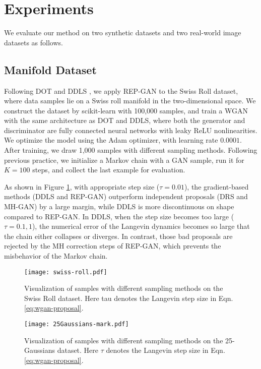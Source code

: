 \documentclass[runningheads]{llncs}
\newcommand{\<}{\left\langle}
\renewcommand{\>}{\right\rangle}
\begin{document}
\section{Experiments}
\label{sec:experiments}
We evaluate our method  on two synthetic datasets and two real-world image datasets as follows.

\subsection{Manifold Dataset}
Following DOT \cite{tanaka2019discriminator} and DDLS \cite{che2020your}, we apply REP-GAN to the Swiss Roll dataset, where data samples lie on a Swiss roll manifold in the two-dimensional space. We construct the dataset by scikit-learn with 100,000 samples, and train a WGAN with the same architecture as DOT and DDLS, where both the generator and discriminator are fully connected neural networks with leaky ReLU nonlinearities. We optimize the model using the Adam optimizer, with learning rate $0.0001$. After training, we draw 1,000 samples with different sampling methods. Following previous practice, we initialize a Markov chain with a GAN sample, run it for $K=100$ steps, and collect the last example for evaluation.

As shown in Figure \ref{fig:swissroll}, with appropriate step size ($\tau=0.01$), the gradient-based methods (DDLS and REP-GAN) outperform independent proposals (DRS and MH-GAN) by a large margin, while DDLS is more discontinuous on shape compared to REP-GAN. In DDLS, when the step size becomes too large ($\tau=0.1,1$), the numerical error of the Langevin dynamics becomes so large that the chain either collapses or diverges. In contrast, those bad proposals are rejected by the MH correction steps of REP-GAN, which prevents the misbehavior of the Markov chain.


\begin{figure}[t]
    \centering
    \texttt{[image: swiss-roll.pdf]}
    \caption{Visualization of samples with different sampling methods on the Swiss Roll dataset. Here tau denotes the Langevin step size in Eqn. \eqref{eq:wgan-proposal}.}
    \label{fig:swissroll}
\end{figure}

\begin{figure}[t]
    \centering
    \texttt{[image: 25Gaussians-mark.pdf]}
    \caption{Visualization of samples with different sampling methods on the 25-Gaussians dataset. Here $\tau$ denotes the Langevin step size in Eqn. \eqref{eq:wgan-proposal}.}
    \label{fig:25gaussians}
\end{figure}
\end{document}
